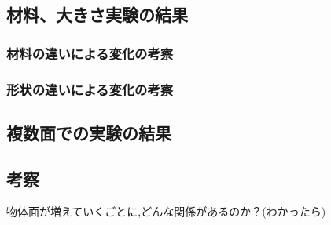 \subsection{材料、大きさ実験の結果}
\label{sec:app_exp_result_material_size}

\subsubsection{材料の違いによる変化の考察}
\label{sec:app_exp_material}

\subsubsection{形状の違いによる変化の考察}
\label{sec:app_exp_size}

\subsection{複数面での実験の結果}
\label{sec:app_exp_result_multi}

\subsection{考察}
\label{sec:app_exp_dissucusion}
物体面が増えていくごとに,どんな関係があるのか？(わかったら)

\clearpage
\newpage